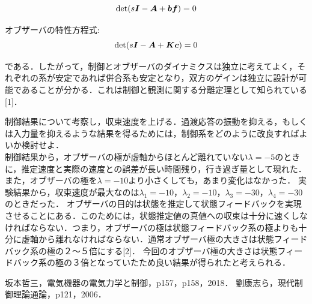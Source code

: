 \documentclass[12pt]{jsarticle}
\begin{document}
\begin{description}
\begin{description}
    \begin{equation}
      {\rm det}(s{\bm I} - {\bm A} + {\bm b}{\bm f}) = 0
    \end{equation}
    \item オブザーバの特性方程式:
    \begin{equation}
      {\rm det}(s{\bm I} - {\bm A} + {\bm K}{\bm c}) = 0
    \end{equation}
  \end{description}
である．したがって，制御とオブザーバのダイナミクスは独立に考えてよく，それぞれの系が安定であれば併合系も安定となり，双方のゲインは独立に設計が可能であることが分かる．これは制御と観測に関する分離定理として知られている[1]．%

  \item[(2)] 制御結果について考察し，収束速度を上げる．過渡応答の振動を抑える，もしくは入力量を抑えるような結果を得るためには，制御系をどのように改良すればよいか検討せよ．\\
  制御結果から，オブザーバの極が虚軸からほとんど離れていない$\lambda=-5$のときに，推定速度と実際の速度との誤差が長い時間残り，行き過ぎ量として現れた．また，オブザーバの極を$\lambda=-10$より小さくしても，あまり変化はなかった．
  実験結果から，収束速度が最大なのは$\lambda_1=-10$，$\lambda_2=-10$，$\lambda_3=-30$，$\lambda_4=-30$のときだった．
  オブザーバの目的は状態を推定して状態フィードバックを実現させることにある．このためには，状態推定値の真値への収束は十分に速くしなければならない．つまり，オブザーバの極は状態フィードバック系の極よりも十分に虚軸から離れなければならない．通常オブザーバ極の大きさは状態フィードバック系の極の２〜５倍にする[2]．%
  今回のオブザーバ極の大きさは状態フィードバック系の極の３倍となっていたため良い結果が得られたと考えられる．
\end{description}

\begin{thebibliography}{9}
   坂本哲三，電気機器の電気力学と制御，p157，p158，2018．
   劉康志ら，現代制御理論通論，p121，2006．
\end{thebibliography}
\end{document}
